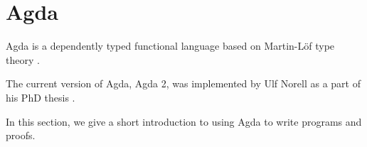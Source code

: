 \section{Agda}
Agda is a dependently typed functional language based on Martin-Löf type theory \cite{Martin-Löf}.

The current version of Agda, Agda 2, was implemented by Ulf Norell as a part of his PhD thesis \cite{Agda}.

In this section, we give a short introduction to using Agda to write programs and proofs.


